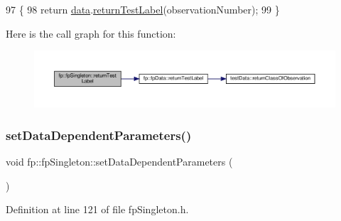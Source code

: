 \begin{DoxyCode}
97                                                              \{
98                 \textcolor{keywordflow}{return} \hyperlink{classfp_1_1fpSingleton_a2fa16ac6a0f66641749032eeee61b8e9}{data}.\hyperlink{classfp_1_1fpData_a50b6343c52560d1992de50e8cd6b1206}{returnTestLabel}(observationNumber);
99             \}
\end{DoxyCode}
Here is the call graph for this function\+:\nopagebreak
\begin{figure}[H]
\begin{center}
\leavevmode
\includegraphics[width=350pt]{classfp_1_1fpSingleton_ac0d2a2fd5ed471c8d507dfd544c12e6d_cgraph}
\end{center}
\end{figure}
\mbox{\label{classfp_1_1fpSingleton_a3edf17209500e72c76ef816e32666eb2}} 
\subsubsection{\texorpdfstring{set\+Data\+Dependent\+Parameters()}{setDataDependentParameters()}}
{\footnotesize\ttfamily void fp\+::fp\+Singleton\+::set\+Data\+Dependent\+Parameters (\begin{DoxyParamCaption}{ }\end{DoxyParamCaption})\hspace{0.3cm}{\ttfamily [inline]}}



Definition at line 121 of file fp\+Singleton.\+h.


